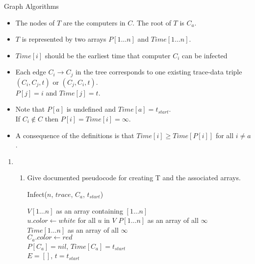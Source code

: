 \documentclass{article}
\numberwithin{table}{section}
\numberwithin{figure}{section}
\begin{document}
\begin{section}{Graph Algorithms}
\begin{itemize}
    \item The nodes of $T$ are the computers in $C$. The root of $T$ is $C_a$.
    \item $T$ is represented by two arrays $P[1 \dots n]$ and $Time[1 \dots n]$.
    \item $Time[i]$ should be the earliest time that computer $C_i$ can be infected
    \item Each edge $C_i \rightarrow C_j$ in the tree corresponds to one existing trace-data triple $(C_i, C_j, t)$ or $(C_j, C_i, t)$. \\
    $P [j] = i$ and $Time[j] = t$.
    \item Note that $P [a]$ is undefined and $Time[a] = t_{start}$. \\
    If $C_i \notin C$ then $P [i] = Time[i] = \infty$.
    \item A consequence of the definitions is that $Time[i] \geq Time[P[i]]$ for all $i \neq a$. 
\end{itemize}

\begin{enumerate}
    \item \begin{enumerate}
        \item Give documented pseudocode for creating T and the associated arrays.
        \begin{tcolorbox}[breakable]
        
        \begin{algorithm}[H]
        \LinesNumbered
        \caption{Infect($n$, $trace$, $C_a$, $t_{start}$)}
        \KwLet $V[1 \dots n]$ as an array containing $[1 \dots n]$ \\
        \KwLet $u.color \gets white$ for all $u$ in $V$ 
        \KwLet $P[1 \dots n]$ as an array of all $\infty$ \\
        \KwLet $Time[1 \dots n]$ as an array of all $\infty$ \\
        
        $C_a.color \gets red$ \\
        $P[C_a] = nil$, 
        $Time[C_a] = t_{start}$ \\
        $E = []$, 
        $t = t_{start}$ \\
\end{algorithm}
\end{tcolorbox}
\end{enumerate}
\end{enumerate}
\end{section}
\end{document}
